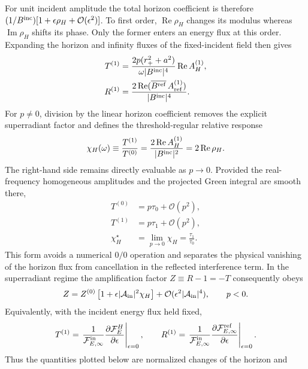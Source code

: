 \documentclass[aps,prd,twocolumn,10pt,nofootinbib,superscriptaddress,floatfix]{revtex4-2}
\newcommand{\calO}{\mathcal{O}}
\newcommand{\rp}{r_+}
\newcommand{\Bin}{B^{\rm inc}}
\newcommand{\Bref}{B^{\rm ref}}
\newcommand{\Aref}{A_{\rm ref}^{(1)}}
\newcommand{\AH}{A_H^{(1)}}
\begin{document}
For unit incident amplitude the total horizon coefficient is therefore
$(1/\Bin)[1+\epsilon\rho_H+\calO(\epsilon^2)]$.  To first order,
$\operatorname{Re}\rho_H$ changes its modulus whereas
$\operatorname{Im}\rho_H$ shifts its phase.  Only the former enters an
energy flux at this order.
Expanding the horizon and infinity fluxes of the fixed-incident field then
gives
\begin{align}
T^{(1)}
&=
\frac{2p(\rp^2+a^2)}{\omega|\Bin|^4}
\operatorname{Re}\AH ,
\label{eq:T1}\\
R^{(1)}
&=
\frac{2\operatorname{Re}(\overline{\Bref}\,\Aref)}{|\Bin|^4}.
\label{eq:R1}
\end{align}
For $p\ne0$, division by the linear horizon coefficient removes the explicit
superradiant factor and defines the threshold-regular relative response
\begin{equation}
\chi_H(\omega)
\equiv\frac{T^{(1)}}{T^{(0)}}
=\frac{2\operatorname{Re}\AH}{|\Bin|^2}
=2\operatorname{Re}\rho_H.
\label{eq:horizon_response}
\end{equation}
The right-hand side remains directly evaluable as $p\to0$.  Provided the
real-frequency homogeneous amplitudes and the projected Green integral are
smooth there,
\begin{align}
T^{(0)}&=p\tau_0+\calO(p^2),\nonumber\\
T^{(1)}&=p\tau_1+\calO(p^2),\nonumber\\
\chi_H^\star&=\lim_{p\to0}\chi_H=\frac{\tau_1}{\tau_0}.
\label{eq:threshold_scaling}
\end{align}
This form avoids a numerical $0/0$ operation and separates the physical
vanishing of the horizon flux from cancellation in the reflected interference
term.  In the superradiant regime the amplification factor
$Z\equiv R-1=-T$ consequently obeys
\begin{equation}
Z=Z^{(0)}\left[1+\epsilon|{\cal A}_{\rm in}|^2\chi_H\right]
+\calO(\epsilon^2|{\cal A}_{\rm in}|^4),\qquad p<0.
\label{eq:superradiant_amplification_response}
\end{equation}
Equivalently, with the incident energy flux held fixed,
\begin{equation}
T^{(1)}=\left.\frac{1}{\mathcal F_{E,\infty}^{\rm in}}
\frac{\partial\mathcal F_E^H}{\partial\epsilon}\right|_{\epsilon=0},
\qquad
R^{(1)}=\left.\frac{1}{\mathcal F_{E,\infty}^{\rm in}}
\frac{\partial\mathcal F_{E,\infty}^{\rm ref}}
{\partial\epsilon}\right|_{\epsilon=0}.
\label{eq:flux_derivative_definition}
\end{equation}
Thus the quantities plotted below are normalized changes of the horizon and
\end{document}

